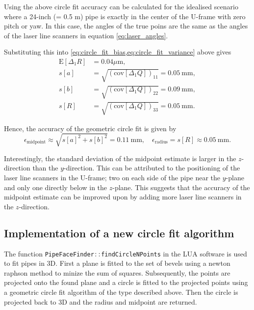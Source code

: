Using the above circle fit accuracy can be calculated for the idealised scenario where a 24-inch (= 0.5 m) pipe is exactly in the center of the U-frame with zero pitch or yaw. In this case, the angles of the true poins are the same as the angles of the laser line scanners in equation \ref{eq:laser_angles}.

Substituting this into \cref{eq:circle_fit_bias,eq:circle_fit_variance} above gives
\begin{align*}
    \text{E}[\Delta_1 R] & = 0.04 \mu \text{m},                                       \\
    s[a]                 & = \sqrt{(\text{cov}[\Delta_1 Q])_{11}} = 0.05 \ \text{mm}, \\
    s[b]                 & = \sqrt{(\text{cov}[\Delta_1 Q])_{22}} = 0.09 \ \text{mm}, \\
    s[R]                 & = \sqrt{(\text{cov}[\Delta_1 Q])_{33}} = 0.05 \ \text{mm}.
\end{align*}

Hence, the accuracy of the geometric circle fit is given by
\begin{equation}
    \epsilon_{\text{midpoint}} \approx \sqrt{s[a]^2 + s[b]^2 } = 0.11 \ \text{mm}, \quad \epsilon_{\text{radius}} = s[R] \approx 0.05 \ \text{mm}.
    \label{eq:circle_fit_accuracy}
\end{equation}

Interestingly, the standard deviation of the midpoint estimate is larger in the $z$-direction than the $y$-direction. This can be attributed to the positioning of the laser line scanners in the U-frame; two on each side of the pipe near the $y$-plane and only one directly below in the $z$-plane. This suggests that the accuracy of the midpoint estimate can be improved upon by adding more laser line scanners in the $z$-direction.

\subsection{Implementation of a new circle fit algorithm}\label{ssec:circle_fit_implementation}
The function \lstinline[language=C]|PipeFaceFinder::findCircleNPoints| in the LUA software is used to fit pipes in 3D. First a plane is fitted to the set of bevels using a newton raphson method to minize the sum of squares. Subsequently, the points are projected onto the found plane and a circle is fitted to the projected points using a geometric circle fit algorithm of the type described above. Then the circle is projected back to 3D and the radius and midpoint are returned.

